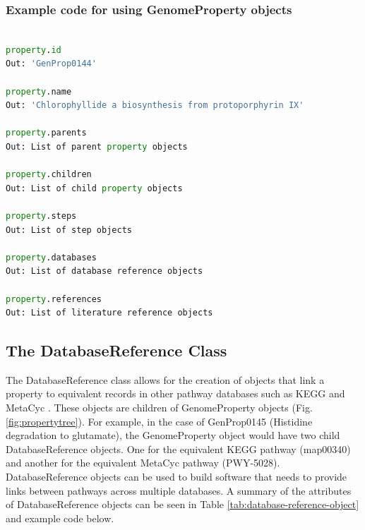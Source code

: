 \subsubsection{Example code for using GenomeProperty objects}

\begin{lstlisting}[language=Python]

property.id
Out: 'GenProp0144'
	
property.name
Out: 'Chlorophyllide a biosynthesis from protoporphyrin IX'

property.parents
Out: List of parent property objects

property.children	
Out: List of child property objects

property.steps
Out: List of step objects		
	
property.databases
Out: List of database reference objects

property.references
Out: List of literature reference objects

\end{lstlisting}

\subsection{The DatabaseReference Class}

The DatabaseReference class allows for the creation of objects that link a property to equivalent records in other pathway databases such as KEGG \cite{kanehisa2000kegg} and MetaCyc \cite{karp2002metacyc}. These objects are children of GenomeProperty objects (Fig. \ref{fig:propertytree}). For example, in the case of GenProp0145 (Histidine degradation to glutamate), the GenomeProperty object would have two child DatabaseReference objects. One for the equivalent KEGG pathway (map00340) and another for the equivalent MetaCyc pathway (PWY-5028). DatabaseReference objects can be used to build software that needs to provide links between pathways across multiple databases. A summary of the attributes of DatabaseReference objects can be seen in Table \ref{tab:database-reference-object} and example code below.


